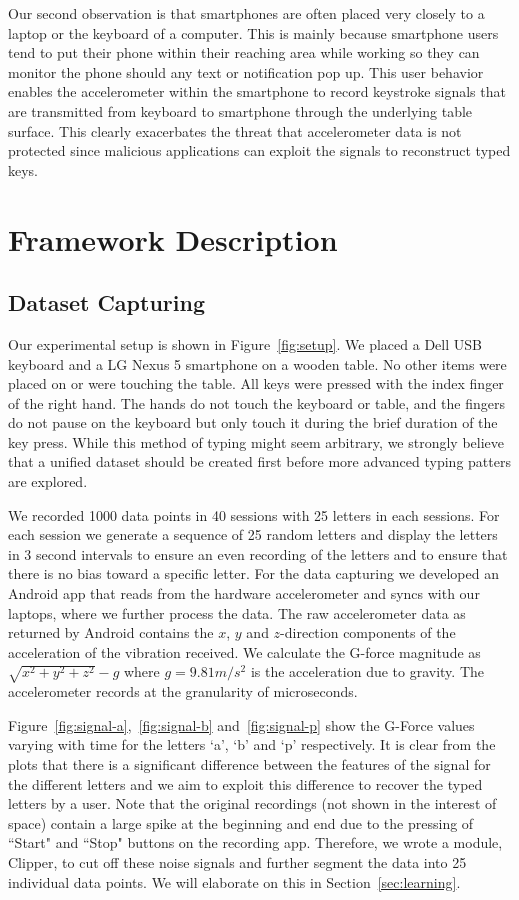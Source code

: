 \documentclass[11pt,conference]{IEEEtran}
\begin{document}
Our second observation is that smartphones are often placed very closely to a laptop or the keyboard of a computer. This is mainly because smartphone users tend to put their phone within their reaching area while working so they can monitor the phone should any text or notification pop up. This user behavior enables the accelerometer within the smartphone to record keystroke signals that are transmitted from keyboard to smartphone through the underlying table surface. This clearly exacerbates the threat that accelerometer data is not protected since malicious applications can exploit the signals to reconstruct typed keys.


\section{Framework Description}

\subsection{Dataset Capturing}
\label{sec:dataset-capturing}
\noindent Our experimental setup is shown in Figure~\ref{fig:setup}. We placed a Dell USB keyboard and a LG Nexus 5 smartphone on a wooden table. No other items were placed on or were touching the table. All keys were pressed with the index finger of the right hand. The hands do not touch the keyboard or table, and the fingers do not pause on the keyboard but only touch it during the brief duration of the key press. While this method of typing might seem arbitrary, we strongly believe that a unified dataset should be created first before more advanced typing patters are explored.

We recorded 1000 data points in 40 sessions with 25 letters in each sessions. For each session we generate a sequence of 25 random letters and display the letters in 3 second intervals to ensure an even recording of the letters and to ensure that there is no bias toward a specific letter. For the data capturing we developed an Android app that reads from the hardware accelerometer and syncs with our laptops, where we further process the data. The raw accelerometer data as returned by Android contains the $x$, $y$ and $z$-direction components of the acceleration of the vibration received. We calculate the G-force magnitude as $\sqrt{x^2+y^2+z^2}-g$ where $g = 9.81 m/s^2$ is the acceleration due to gravity. The accelerometer records at the granularity of microseconds.

Figure~\ref{fig:signal-a},~\ref{fig:signal-b} and~\ref{fig:signal-p} show the G-Force values varying with time for the
letters `a', `b' and `p' respectively. It is clear from the plots that there is a significant difference between the features
of the signal for the different letters and we aim to exploit this difference to recover the typed letters by a user.
Note that the original recordings (not shown in the interest of space) contain a large spike at the beginning and end
due to the pressing of ``Start" and ``Stop" buttons on the recording app.
Therefore, we wrote a module, Clipper, to cut off these noise signals and further segment the data into 25 individual data points.
We will elaborate on this in Section~\ref{sec:learning}.
\end{document}
